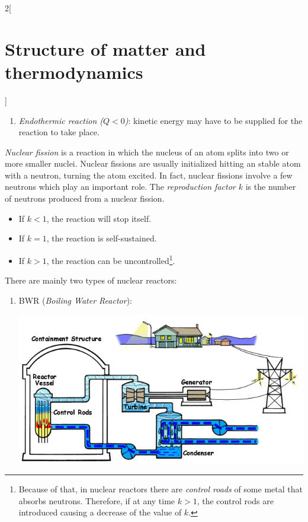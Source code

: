 \documentclass[../../../main.tex]{subfiles}
\begin{document}
\begin{multicols}{2}[\section{Structure of matter and thermodynamics}]
\begin{definition}
\begin{enumerate}
      \item \textit{Endothermic reaction ($Q<0$)}: kinetic energy may have to be supplied for the reaction to take place.
    \end{enumerate}
  \end{definition}
  \begin{definition}
    \textit{Nuclear fission} is a reaction in which the nucleus of an atom splits into two or more smaller nuclei. Nuclear fissions are usually initialized hitting an stable atom with a neutron, turning the atom excited. In fact, nuclear fissions involve a few neutrons which play an important role. The \textit{reproduction factor $k$} is the number of neutrons produced from a nuclear fission.
    \begin{itemize}
      \item If $k<1$, the reaction will stop itself.
      \item If $k=1$, the reaction is self-sustained.
      \item If $k>1$, the reaction can be uncontrolled\footnote{Because of that, in nuclear reactors there are \textit{control roads} of some metal that absorbs neutrons. Therefore, if at any time $k>1$, the control rods are introduced causing a decrease of the value of $k$.}.
    \end{itemize}
  \end{definition}
  \begin{definition}
    There are mainly two types of nuclear reactors:
    \begin{enumerate}
      \item BWR (\textit{Boiling Water Reactor}):
            \begin{center}
              \begin{minipage}{\linewidth}
                \centering
                \includegraphics[width=\linewidth]{Images/bwr.jpg}

\end{minipage}
\end{center}
\end{enumerate}
\end{definition}
\end{multicols}
\end{document}
